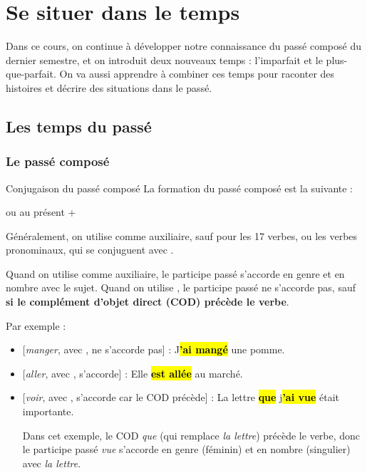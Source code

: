 \section{Se situer dans le temps}

Dans ce cours, on continue à développer notre connaissance du passé composé du dernier semestre,
et on introduit deux nouveaux temps : l'imparfait et le plus-que-parfait. On va aussi apprendre
à combiner ces temps pour raconter des histoires et décrire des situations dans le passé.

\subsection{Les temps du passé}

\subsubsection{Le passé composé}

\begin{frbox}{Conjugaison du passé composé}
    La formation du passé composé est la suivante :

    {
        \centering
         ou  au présent + \par
    }

    Généralement, on utilise  comme auxiliaire, sauf pour les 17 verbes, ou les
    verbes pronominaux, qui se conjuguent avec .

    Quand on utilise  comme auxiliaire, le participe passé s'accorde en genre
    et en nombre avec le sujet. Quand on utilise , le participe passé ne s'accorde
    pas, sauf \textbf{si le complément d'objet direct (COD) précède le verbe}.
\end{frbox}

Par exemple :

\begin{itemize}
    \item{} [\textit{manger}, avec , ne s'accorde pas] : J\hl{\textbf{'ai mangé}} une pomme.
    \item{} [\textit{aller}, avec , s'accorde] : Elle \hl{\textbf{est allée}} au marché.
    \item{} [\textit{voir}, avec , s'accorde car le COD précède] : La lettre \hl{\textbf{que}} j\hl{\textbf{'ai vue}} était importante.
    
    Dans cet exemple, le COD \textit{que} (qui remplace \textit{la lettre}) précède le verbe,
    donc le participe passé \textit{vue} s'accorde en genre (féminin) et en nombre (singulier) avec
    \textit{la lettre}.
\end{itemize}

